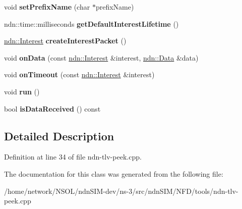 \begin{DoxyCompactItemize}
\item 
void {\bfseries set\+Prefix\+Name} (char $\ast$prefix\+Name)\hypertarget{classndntlvpeek_1_1NdnTlvPeek_a10cb0f5396ddb55f36f1ca9c4c5dc35d}{}\label{classndntlvpeek_1_1NdnTlvPeek_a10cb0f5396ddb55f36f1ca9c4c5dc35d}

\item 
ndn\+::time\+::milliseconds {\bfseries get\+Default\+Interest\+Lifetime} ()\hypertarget{classndntlvpeek_1_1NdnTlvPeek_a70cada025871ba750523b58c7490e737}{}\label{classndntlvpeek_1_1NdnTlvPeek_a70cada025871ba750523b58c7490e737}

\item 
\hyperlink{classndn_1_1Interest}{ndn\+::\+Interest} {\bfseries create\+Interest\+Packet} ()\hypertarget{classndntlvpeek_1_1NdnTlvPeek_ad5f365d9e1186af7580c8cd8816437f8}{}\label{classndntlvpeek_1_1NdnTlvPeek_ad5f365d9e1186af7580c8cd8816437f8}

\item 
void {\bfseries on\+Data} (const \hyperlink{classndn_1_1Interest}{ndn\+::\+Interest} \&interest, \hyperlink{classndn_1_1Data}{ndn\+::\+Data} \&data)\hypertarget{classndntlvpeek_1_1NdnTlvPeek_a6b7d4a7fd18dda48390a9184d1fe7305}{}\label{classndntlvpeek_1_1NdnTlvPeek_a6b7d4a7fd18dda48390a9184d1fe7305}

\item 
void {\bfseries on\+Timeout} (const \hyperlink{classndn_1_1Interest}{ndn\+::\+Interest} \&interest)\hypertarget{classndntlvpeek_1_1NdnTlvPeek_a0820eae9f0a3014b018da61a662eaf86}{}\label{classndntlvpeek_1_1NdnTlvPeek_a0820eae9f0a3014b018da61a662eaf86}

\item 
void {\bfseries run} ()\hypertarget{classndntlvpeek_1_1NdnTlvPeek_a9905ecfa19b73fc56c47e1b24477b951}{}\label{classndntlvpeek_1_1NdnTlvPeek_a9905ecfa19b73fc56c47e1b24477b951}

\item 
bool {\bfseries is\+Data\+Received} () const\hypertarget{classndntlvpeek_1_1NdnTlvPeek_aba4f86e9ede6104e3510c5492eacbc40}{}\label{classndntlvpeek_1_1NdnTlvPeek_aba4f86e9ede6104e3510c5492eacbc40}

\end{DoxyCompactItemize}


\subsection{Detailed Description}


Definition at line 34 of file ndn-\/tlv-\/peek.\+cpp.



The documentation for this class was generated from the following file\+:\begin{DoxyCompactItemize}
\item 
/home/network/\+N\+S\+O\+L/ndn\+S\+I\+M-\/dev/ns-\/3/src/ndn\+S\+I\+M/\+N\+F\+D/tools/ndn-\/tlv-\/peek.\+cpp\end{DoxyCompactItemize}
